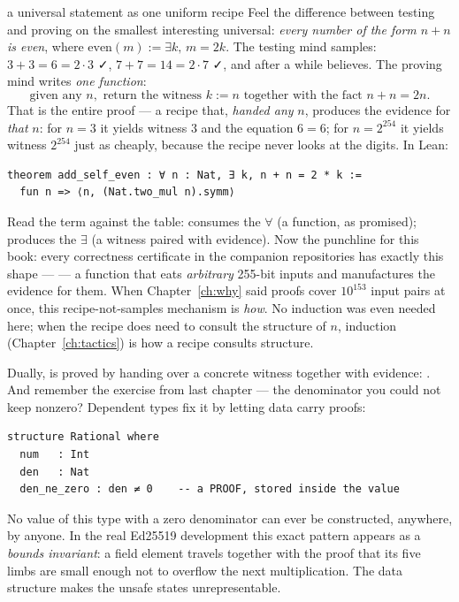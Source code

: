 \begin{worked}{a universal statement as one uniform recipe}
Feel the difference between testing and proving on the smallest
interesting universal: \emph{every number of the form $n + n$ is even},
where $\mathrm{even}(m) := \exists k,\, m = 2k$. The testing mind
samples: $3 + 3 = 6 = 2\cdot 3$ ✓, $7 + 7 = 14 = 2 \cdot 7$ ✓, and after
a while believes. The proving mind writes \emph{one function}:
\[
\text{given any } n, \text{ return the witness } k := n
\text{ together with the fact } n + n = 2n .
\]
That is the entire proof --- a recipe that, \emph{handed any} $n$,
produces the evidence for \emph{that} $n$: for $n = 3$ it yields witness
$3$ and the equation $6 = 6$; for $n = 2^{254}$ it yields witness
$2^{254}$ just as cheaply, because the recipe never looks at the digits.
In Lean:
\begin{lstlisting}[language=Lean]
theorem add_self_even : ∀ n : Nat, ∃ k, n + n = 2 * k :=
  fun n => ⟨n, (Nat.two_mul n).symm⟩
\end{lstlisting}
Read the term against the table:  consumes the $\forall$
(a function, as promised);  produces the $\exists$ (a
witness paired with evidence). Now the punchline for this book: every
correctness certificate in the companion repositories has exactly this
shape ---  --- a function that
eats \emph{arbitrary} 255-bit inputs and manufactures the evidence for
them. When Chapter~\ref{ch:why} said proofs cover $10^{153}$ input pairs
at once, this recipe-not-samples mechanism is \emph{how}. No induction
was even needed here; when the recipe does need to consult the
structure of $n$, induction (Chapter~\ref{ch:tactics}) is how a recipe
consults structure.
\end{worked}

Dually,  is proved by handing over a concrete witness
together with evidence: . And remember the
 exercise from last chapter --- the denominator you could not
keep nonzero? Dependent types fix it by letting data carry proofs:

\begin{lstlisting}[language=Lean]
structure Rational where
  num   : Int
  den   : Nat
  den_ne_zero : den ≠ 0    -- a PROOF, stored inside the value
\end{lstlisting}

No value of this type with a zero denominator can ever be constructed,
anywhere, by anyone. In the real Ed25519 development this exact pattern
appears as a \emph{bounds invariant}: a field element travels together with
the proof that its five limbs are small enough not to overflow the next
multiplication. The data structure makes the unsafe states unrepresentable.


